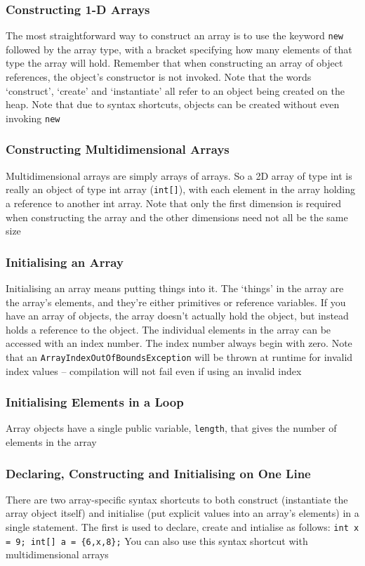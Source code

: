 \subsubsection{Constructing 1-D Arrays}
The most straightforward way to  construct an array is to use the keyword 
\verb#new# followed by the array type, with a bracket specifying how many 
elements of that type the array will hold. Remember that when constructing an 
array of object references, the object's constructor is not invoked. Note that 
the words `construct', `create' and `instantiate' all refer to an object being 
created on the heap. Note that due to syntax shortcuts, objects can be created 
without even invoking \verb#new#

\subsubsection{Constructing Multidimensional Arrays}
Multidimensional arrays are simply arrays of arrays. So a 2D array of type int 
is really an object of type int array (\verb#int[]#), with each element in the 
array holding a reference to another int array. Note that only the first 
dimension is required when constructing the array and the other dimensions need 
not all be the same size

\subsubsection{Initialising an Array}
Initialising an array means putting things into it. The `things' in the array 
are the array's elements, and they're either primitives or reference variables.
If you have an array of objects, the array doesn't actually hold the object, 
but instead holds a reference to the object. The individual elements in the 
array can be accessed with an index number. The index number always begin with 
zero. Note that an \verb#ArrayIndexOutOfBoundsException# will be thrown at 
runtime for invalid index values -- compilation will not fail even if using an 
invalid index

\subsubsection{Initialising Elements in a Loop}
Array objects have a single public variable, \verb#length#, that gives the 
number of elements in the array

\subsubsection{Declaring, Constructing and Initialising on One Line}
There are two array-specific syntax shortcuts to both construct (instantiate 
the array object itself) and initialise (put explicit values into an array's 
elements) in a single statement. The first is used to declare, create and 
intialise as follows: \verb#int x = 9; int[] a = {6,x,8};# You can also use 
this syntax shortcut with multidimensional arrays

